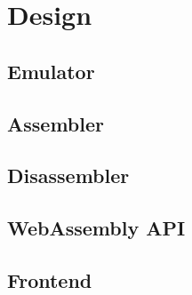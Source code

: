 \chapter{Design}\label{chap:design}

\section{Emulator}

\section{Assembler}

\section{Disassembler}

\section{WebAssembly API}

\section{Frontend}
